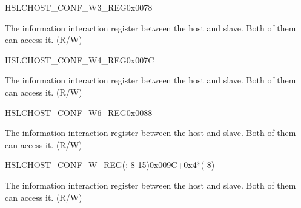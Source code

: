 \begin{register}{H}{SLCHOST\_CONF\_W3\_REG}{0x0078}\label{regdesc:SLCHOSTCONFW3REG}
%
%
\regnewline%
\begin{regdesc}\begin{reglist}
\label{fielddesc:SLCHOSTSLCHOSTCONF3}\item [SLCHOST\_SLCHOST\_CONF3] The information interaction register between the host and slave. Both of them can access it. (R/W)
\end{reglist}\end{regdesc}
\end{register}


\begin{register}{H}{SLCHOST\_CONF\_W4\_REG}{0x007C}\label{regdesc:SLCHOSTCONFW4REG}
%
%
\regnewline%
\begin{regdesc}\begin{reglist}
\label{fielddesc:SLCHOSTSLCHOSTCONF4}\item [SLCHOST\_SLCHOST\_CONF4] The information interaction register between the host and slave. Both of them can access it. (R/W)
\end{reglist}\end{regdesc}
\end{register}


\begin{register}{H}{SLCHOST\_CONF\_W6\_REG}{0x0088}\label{regdesc:SLCHOSTCONFW6REG}
%
\regnewline%
\begin{regdesc}\begin{reglist}
\label{fielddesc:SLCHOSTSLCHOSTCONF6}\item [SLCHOST\_SLCHOST\_CONF6] The information interaction register between the host and slave. Both of them can access it. (R/W)
\end{reglist}\end{regdesc}
\end{register}


\begin{register}{H}{SLCHOST\_CONF\_W\_REG(: 8-15)}{0x009C+0x4*(-8)}\label{regdesc:SLCHOSTCONFW815REG}
%
\regnewline%
\begin{regdesc}\begin{reglist}
\label{fielddesc:SLCHOSTSLCHOSTCONF815}\item [SLCHOST\_SLCHOST\_CONF\regindex{n}] The information interaction register between the host and slave. Both of them can access it. (R/W)
\end{reglist}\end{regdesc}
\end{register}

